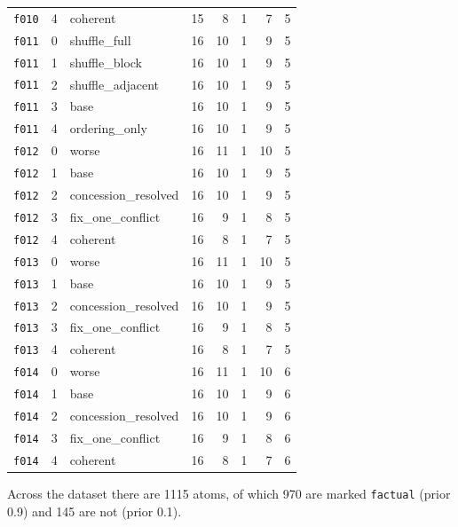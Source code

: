 \documentclass[11pt]{article}
\begin{document}
\begin{table}[htbp]
\begin{tabular}{lllrrrrr}
\texttt{f010} & 4 & coherent & 15 & 8 & 1 & 7 & 5 \\
\texttt{f011} & 0 & shuffle\_full & 16 & 10 & 1 & 9 & 5 \\
\texttt{f011} & 1 & shuffle\_block & 16 & 10 & 1 & 9 & 5 \\
\texttt{f011} & 2 & shuffle\_adjacent & 16 & 10 & 1 & 9 & 5 \\
\texttt{f011} & 3 & base & 16 & 10 & 1 & 9 & 5 \\
\texttt{f011} & 4 & ordering\_only & 16 & 10 & 1 & 9 & 5 \\
\texttt{f012} & 0 & worse & 16 & 11 & 1 & 10 & 5 \\
\texttt{f012} & 1 & base & 16 & 10 & 1 & 9 & 5 \\
\texttt{f012} & 2 & concession\_resolved & 16 & 10 & 1 & 9 & 5 \\
\texttt{f012} & 3 & fix\_one\_conflict & 16 & 9 & 1 & 8 & 5 \\
\texttt{f012} & 4 & coherent & 16 & 8 & 1 & 7 & 5 \\
\texttt{f013} & 0 & worse & 16 & 11 & 1 & 10 & 5 \\
\texttt{f013} & 1 & base & 16 & 10 & 1 & 9 & 5 \\
\texttt{f013} & 2 & concession\_resolved & 16 & 10 & 1 & 9 & 5 \\
\texttt{f013} & 3 & fix\_one\_conflict & 16 & 9 & 1 & 8 & 5 \\
\texttt{f013} & 4 & coherent & 16 & 8 & 1 & 7 & 5 \\
\texttt{f014} & 0 & worse & 16 & 11 & 1 & 10 & 6 \\
\texttt{f014} & 1 & base & 16 & 10 & 1 & 9 & 6 \\
\texttt{f014} & 2 & concession\_resolved & 16 & 10 & 1 & 9 & 6 \\
\texttt{f014} & 3 & fix\_one\_conflict & 16 & 9 & 1 & 8 & 6 \\
\texttt{f014} & 4 & coherent & 16 & 8 & 1 & 7 & 6 \\
\bottomrule
\end{tabular}
\end{table}

Across the dataset there are 1115 atoms, of which 970 are marked \texttt{factual} (prior 0.9) and 145 are not (prior 0.1).
\end{document}
